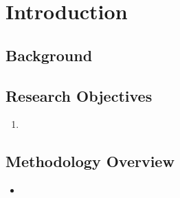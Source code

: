 \section{Introduction}
\label{sec:introduction}

\subsection{Background}

\subsection{Research Objectives}


\begin{enumerate}
    \item 
\end{enumerate}

\subsection{Methodology Overview}

\begin{itemize}
    \item 
\end{itemize}

